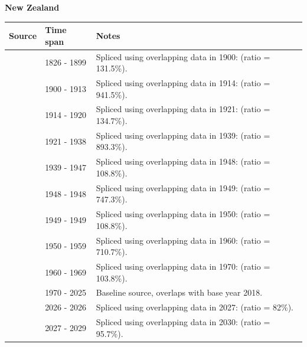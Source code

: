 \documentclass[12pt,a4paper,landscape]{article}
\begin{document}
\begin{adjustbox}{max totalsize={\paperwidth}{\paperheight},center}
\begin{minipage}[t][\textheight][t]{\textwidth}
\vspace*{0.5cm}
{}
\begin{center}
{\Large\bfseries New Zealand}
\end{center}
\vspace{0.5cm}
\begin{table}[H]
\centering
\small
\begin{tabular}{|l|l|l|}
\hline
\textbf{Source} & \textbf{Time span} & \textbf{Notes} \\
\hline
\rowcolor{white}\cite{Tena}& 1826 - 1899 &Spliced using overlapping data in 1900: (ratio = 131.5\%).\\
\rowcolor{lightgray}\cite{UN_trade}& 1900 - 1913 &Spliced using overlapping data in 1914: (ratio = 941.5\%).\\
\rowcolor{white}\cite{Tena}& 1914 - 1920 &Spliced using overlapping data in 1921: (ratio = 134.7\%).\\
\rowcolor{lightgray}\cite{UN_trade}& 1921 - 1938 &Spliced using overlapping data in 1939: (ratio = 893.3\%).\\
\rowcolor{white}\cite{Mitchell}& 1939 - 1947 &Spliced using overlapping data in 1948: (ratio = 108.8\%).\\
\rowcolor{lightgray}\cite{UN_trade}& 1948 - 1948 &Spliced using overlapping data in 1949: (ratio = 747.3\%).\\
\rowcolor{white}\cite{Mitchell}& 1949 - 1949 &Spliced using overlapping data in 1950: (ratio = 108.8\%).\\
\rowcolor{lightgray}\cite{UN_trade}& 1950 - 1959 &Spliced using overlapping data in 1960: (ratio = 710.7\%).\\
\rowcolor{white}\cite{AMECO}& 1960 - 1969 &Spliced using overlapping data in 1970: (ratio = 103.8\%).\\
\rowcolor{lightgray}\cite{OECD_EO}& 1970 - 2025 &Baseline source, overlaps with base year 2018.\\
\rowcolor{white}\cite{AMECO}& 2026 - 2026 &Spliced using overlapping data in 2027: (ratio = 82\%).\\
\rowcolor{lightgray}\cite{IMF_WEO_forecast}& 2027 - 2029 &Spliced using overlapping data in 2030: (ratio = 95.7\%).\\
\hline
\end{tabular}
\end{table}

\end{minipage}
\end{adjustbox}
\end{document}
